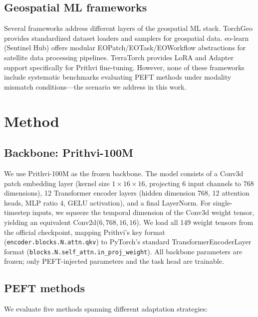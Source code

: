 \documentclass{article}
\begin{document}
\subsection{Geospatial ML frameworks}

Several frameworks address different layers of the geospatial ML stack. TorchGeo \citep{stewart2024torchgeo} provides standardized dataset loaders and samplers for geospatial data. eo-learn (Sentinel Hub) offers modular EOPatch/EOTask/EOWorkflow abstractions for satellite data processing pipelines. TerraTorch \citep{ibm2025terratorch} provides LoRA and Adapter support specifically for Prithvi fine-tuning. However, none of these frameworks include systematic benchmarks evaluating PEFT methods under modality mismatch conditions---the scenario we address in this work.

\section{Method}
\label{sec:method}

\subsection{Backbone: Prithvi-100M}

We use Prithvi-100M \citep{jakubik2024prithvi} as the frozen backbone. The model consists of a Conv3d patch embedding layer (kernel size $1 \times 16 \times 16$, projecting 6 input channels to 768 dimensions), 12 Transformer encoder layers (hidden dimension 768, 12 attention heads, MLP ratio 4, GELU activation), and a final LayerNorm. For single-timestep inputs, we squeeze the temporal dimension of the Conv3d weight tensor, yielding an equivalent Conv2d($6, 768, 16, 16$). We load all 149 weight tensors from the official checkpoint, mapping Prithvi's key format (\texttt{encoder.blocks.N.attn.qkv}) to PyTorch's standard TransformerEncoderLayer format (\texttt{blocks.N.self\_attn.in\_proj\_weight}). All backbone parameters are frozen; only PEFT-injected parameters and the task head are trainable.

\subsection{PEFT methods}

We evaluate five methods spanning different adaptation strategies:
\end{document}
